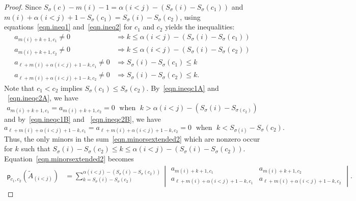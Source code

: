 \documentclass[10pt,a4paper]{amsart}
\newcommand{\al}{\alpha}
\newcommand{\gs}{\sigma}
\newcommand{\mi}[1]{m(#1)}
\newcommand{\pl}{\mathsf{p}}
\begin{document}
\begin{proof}
Since $S_\gs(c)-\mi{i}-1 = \al(i<j) - \left( S_\gs(i) - S_\gs(c_1) \right)$ and $\mi{i}+\al(i<j) +1 -S_\gs(c_1) = S_\gs(i)-S_{\gs}(c_2)$, using  equations~\eqref{eqn.ineq1} and~\eqref{eqn.ineq2} for $c_1$ and $c_2$ yields the inequalities:
\begin{align}
\label{eqn.ineqc1A} a_{\mi{i}+k+1, c_1} \neq 0 &\Rightarrow k \leq   \al(i<j) - \left(S_\gs(i)-S_\gs(c_1)\right) \\
\label{eqn.ineqc2A} a_{\mi{i}+k+1, c_2} \neq 0 &\Rightarrow k \leq   \al(i<j) - \left(S_\gs(i)-S_\gs(c_2)\right) \\
\label{eqn.ineqc1B} a_{\ell + \mi{i} + \al(i<j)+1-k,c_1} \neq 0 &\Rightarrow S_\gs(i)-S_\gs(c_1) \leq k \\
\label{eqn.ineqc2B} a_{\ell + \mi{i} + \al(i<j)+1-k,c_2} \neq 0 &\Rightarrow S_\gs(i)-S_\gs(c_2) \leq k .
\end{align}
Note that $c_1< c_2$ implies $S_\gs(c_1)\leq S_\gs(c_2)$. By~\eqref{eqn.ineqc1A} and ~\eqref{eqn.ineqc2A}, we have 
\[
a_{\mi{i}+k+1, c_1} = a_{\mi{i}+k+1, c_2} = 0 \; \text{ when } \; k > \al(i<j) - \left( S_\gs(i)-S_{\gs(c_2)} \right)
\]
and by~\eqref{eqn.ineqc1B} and ~\eqref{eqn.ineqc2B}, we have  
\[
a_{\ell + \mi{i} + \al(i<j)+1-k,c_1} = a_{\ell + \mi{i} + \al(i<j)+1-k,c_2} = 0 \; \text{ when } \; k< S_{\gs(i)} - S_\gs(c_2).
\]
Thus, the only minors in the sum~\eqref{eqn.minorsextended2} which are nonzero occur for $k$ such that $S_\gs(i)-S_\gs(c_2) \leq k \leq \al(i<j)- \left( S_\gs(i)-S_\gs(c_2) \right)$. Equation~\eqref{eqn.minorsextended2} becomes
\begin{align}\label{eqn.minorsextended3}
\pl_{c_1, c_2}(\widetilde A_{(i<j)}) & =  \sum_{k=S_\gs(i)-S_\gs(c_2)}^{\al(i<j) - \left( S_\gs(i)-S_\gs(c_2) \right)} \begin{vmatrix} a_{\mi{i}+k+1, c_1} & a_{\mi{i}+k+1, c_2}\\ a_{\ell+\mi{i}+\al(i<j) +1 - k, c_1} & a_{\ell+\mi{i}+\al(i<j) +1 - k, c_2}  \end{vmatrix}. 
\end{align}


\end{proof}
\end{document}
